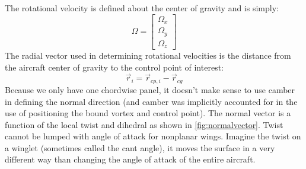 \documentclass{article}
\begin{document}


The rotational velocity is defined about the center of gravity and is simply:
\begin{equation}
    \Omega =
    \begin{bmatrix}
    \Omega_x\\ \Omega_y\\ \Omega_z
    \end{bmatrix}
\end{equation}
The radial vector used in determining rotational velocities is the distance from the aircraft center of gravity to the control point of interest:
\begin{equation}
\vec{r}_i = \vec r_{cp, i} - \vec r_{cg}
\end{equation}
Because we only have one chordwise panel, it doesn't make sense to use camber in defining the normal direction (and camber was implicitly accounted for in the use of positioning the bound vortex and control point).  The normal vector is a function of the local twist and dihedral as shown in \cref{fig:normalvector}.  Twist cannot be lumped with angle of attack for nonplanar wings.  Imagine the twist on a winglet (sometimes called the cant angle), it moves  the surface in a very different way than changing the angle of attack of the entire aircraft.
\end{document}
